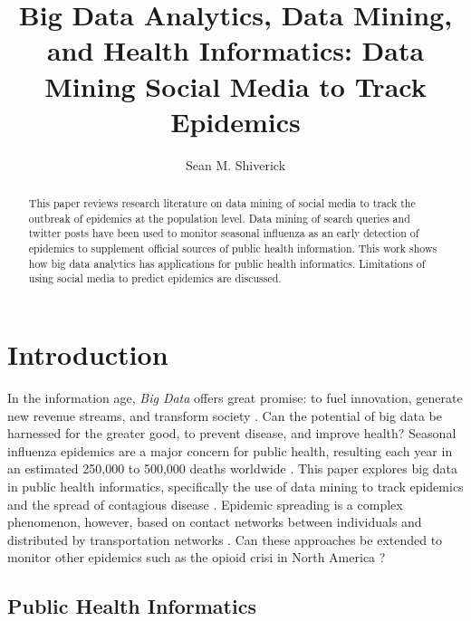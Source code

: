 \documentclass[sigconf]{acmart}
\begin{document}
\title{Big Data Analytics, Data Mining, and Health Informatics: 
Data Mining Social Media to Track Epidemics}
\author{Sean M. Shiverick}


\begin{abstract}
This paper reviews research literature on data mining of social media to 
track the outbreak of epidemics at the population level. Data mining of 
search queries and twitter posts have been used to monitor seasonal influenza
as an early detection of epidemics to supplement official sources of public 
health information. This work shows how big data analytics has applications 
for public health informatics. Limitations of using social media to predict 
epidemics are discussed.
\end{abstract}



\maketitle

\section{Introduction}

In the information age, \textit{Big Data} offers great promise: to fuel innovation, 
generate new revenue streams, and transform society \cite{gupta15}. Can the 
potential of big data be harnessed for the greater good, to prevent disease, 
and improve health? Seasonal influenza epidemics are a major concern for public 
health, resulting each year in an estimated 250,000 to 500,000 deaths worldwide \cite{who17}. This paper explores big data in public health informatics, 
specifically the use of data mining to track epidemics and the spread of 
contagious disease \cite{hay13}. Epidemic spreading is a complex phenomenon, 
however, based on contact networks between individuals and distributed by 
transportation networks \cite{Colizza06}. Can these approaches be extended to 
monitor other epidemics such as the opioid crisi in North America \cite{volkow14}?


\subsection{Public Health Informatics}
\end{document}
